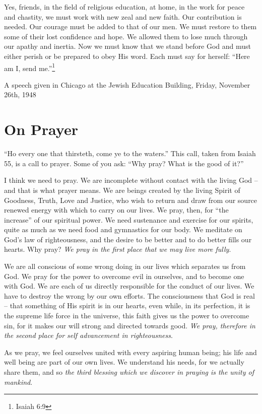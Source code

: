\documentclass[14pt, article, extrafontsizes, twopage, a4paper]{memoir}
\newcommand{\attr}[1]{
  {\raggedleft\smaller#1

  }
}
\begin{document}
Yes, friends, in the field of religious education, at
home, in the work for peace and chastity, we must work with
new zeal and new faith. Our contribution is needed. Our
courage must be added to that of our men. We must restore
to them some of their lost confidence and hope. We allowed
them to lose much through our apathy and inertia. Now we
must know that we stand before God and must either perish
or be prepared to obey His word. Each must say for
herself: ``Here am I, send me.''\footnote{Isaiah 6:9}

\attr{A speech given in Chicago at the Jewish Education Building, Friday, November 26th, 1948}

\clearpage
\chapter{On Prayer}

``Ho every one that thirsteth, come ye to the waters.''
This call, taken from Isaiah 55, is a call to prayer. Some
of you ask: ``Why pray? What is the good of it?''

I think we need to pray. We are incomplete without
contact with the living God -- and that is what prayer
means. We are beings created by the living Spirit of
Goodness, Truth, Love and Justice, who wish to return and
draw from our source renewed energy with which to carry on
our lives. We pray, then, for “the increase'' of our
spiritual power. We need sustenance and exercise for our
spirits, quite as much as we need food and gymnastics for
our body. We meditate on God's law of righteousness, and
the desire to be better and to do better fills our hearts.
Why pray? \textsl{We pray in the first place that we may live more
fully}.

We are all conscious of some wrong doing in our lives
which separates us from God. We pray for the power to
overcome evil in ourselves, and to become one with God. We
are each of us directly responsible for the conduct of our
lives. We have to destroy the wrong by our own efforts.
The consciousness that God is real -- that something of His
spirit is in our hearts, even while, in its perfection, it
is the supreme life force in the universe, this faith gives
us the power to overcome sin, for it makes our will strong
and directed towards good. \textsl{We pray, therefore in the
second place for self advancement in righteousness}.

As we pray, we feel ourselves united with every
aspiring human being; his life and well being are part of
our own lives. We understand his needs, for we actually
share them, and so \textsl{the third blessing which we discover in
  praying is the unity of mankind}.
\end{document}
